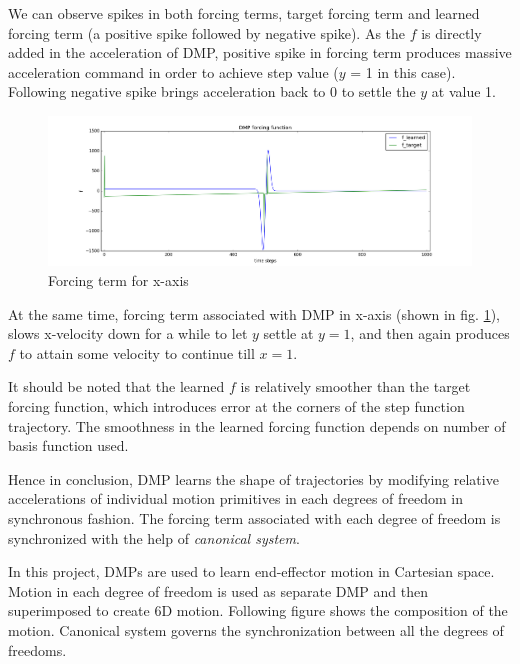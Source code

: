 We can observe spikes in both forcing terms, target forcing term and learned forcing term (a positive spike followed by negative spike). As the $f$ is directly added in the acceleration of DMP, positive spike in forcing term produces massive acceleration command in order to achieve step value ($y$ = 1 in this case). Following negative spike brings acceleration back to 0 to settle the $y$ at value 1.   



\begin{figure}[H]
	\centering
	\includegraphics[scale=0.38]{images/f_x.png}
	\caption{Forcing term for x-axis}
	\label{fig:step_f_x}
\end{figure}
At the same time, forcing term associated with DMP in x-axis (shown in fig. \ref{fig:step_f_x}), slows x-velocity down for a while to let $y$ settle at $y = 1$, and then again produces $f$ to attain some velocity to continue till $x = 1$. 

It should be noted that the learned $f$ is relatively smoother than the target forcing function, which introduces error at the corners of the step function trajectory. The smoothness in the learned forcing function depends on number of basis function used.   

Hence in conclusion, DMP learns the shape of trajectories by modifying relative accelerations of individual motion primitives in each degrees of freedom in synchronous fashion. The forcing term associated with each degree of freedom is synchronized with the help of \textit{canonical system}. 

In this project, DMPs are used to learn end-effector motion in Cartesian space. Motion in each degree of freedom is used as separate DMP and then superimposed to create 6D motion. Following figure shows the composition of the motion. Canonical system governs the synchronization between all the degrees of freedoms.

